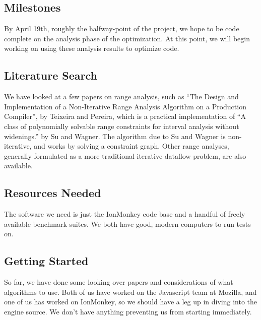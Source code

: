 \documentclass{article}
\begin{document}
\subsection{Milestones}
By April 19th, roughly the halfway-point of the project, we hope to be
code complete on the analysis phase of the optimization. At this
point, we will begin working on using these analysis results to
optimize code.

\subsection{Literature Search}
We have looked at a few papers on range analysis, such as ``The Design
and Implementation of a Non-Iterative Range Analysis Algorithm on a
Production Compiler'', by Teixeira and Pereira, which is a practical
implementation of ``A class of polynomially solvable range
constraints for interval analysis without widenings.'' by Su and Wagner. The
algorithm due to Su and Wagner is non-iterative, and works by solving a
constraint graph. Other range analyses, generally formulated as a more
traditional iterative dataflow problem, are also available.

\subsection{Resources Needed}
The software we need is just the IonMonkey code base and a handful of
freely available benchmark suites. We both have good, modern computers
to run tests on.

\subsection{Getting Started}
So far, we have done some looking over papers and considerations of
what algorithms to use. Both of us have worked on the Javascript team
at Mozilla, and one of us has worked on IonMonkey, so we should have a
leg up in diving into the engine source. We don't have anything preventing us
from starting immediately.
\end{document}
